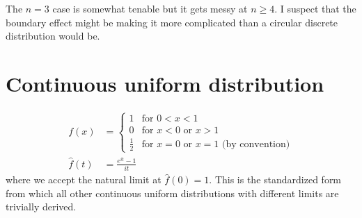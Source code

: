 \documentclass{article}
\newcommand{\intR}{\int_{\mathbb{R}}}
\begin{document}
The $n=3$ case is somewhat tenable but it gets messy at $n \geq 4$. I suspect
that the boundary effect might be making it more complicated than a circular
discrete distribution would be.

\section{Continuous uniform distribution}

\begin{align}
  f(x) & = \begin{cases} 
    1 & \textrm{for } 0 < x < 1 \\
    0 & \textrm{for } x < 0 \textrm{ or } x > 1 \\
    \frac{1}{2} & \textrm{for } x = 0 \textrm{ or } x = 1 \textrm{ (by convention)}
  \end{cases}\\
  \hat f(t) & = \frac{e^{it} - 1}{it}
\end{align}
where we accept the natural limit at $\hat f(0) = 1$. This is the standardized
form from which all other continuous uniform distributions with different
limits are trivially derived.

\end{document}
